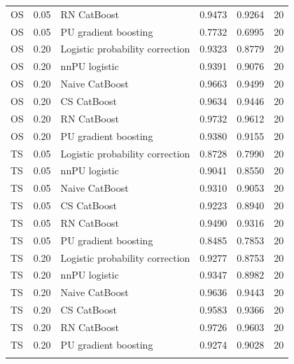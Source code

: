 \begin{longtable}{@{}p{0.65in}rp{2.85in}rrr@{}}
OS & 0.05 & RN CatBoost & 0.9473 & 0.9264 & 20 \\
OS & 0.05 & PU gradient boosting & 0.7732 & 0.6995 & 20 \\
\addlinespace[2pt]
OS & 0.20 & Logistic probability correction & 0.9323 & 0.8779 & 20 \\
OS & 0.20 & nnPU logistic & 0.9391 & 0.9076 & 20 \\
OS & 0.20 & Naive CatBoost & 0.9663 & 0.9499 & 20 \\
OS & 0.20 & CS CatBoost & 0.9634 & 0.9446 & 20 \\
OS & 0.20 & RN CatBoost & 0.9732 & 0.9612 & 20 \\
OS & 0.20 & PU gradient boosting & 0.9380 & 0.9155 & 20 \\
\addlinespace[2pt]
TS & 0.05 & Logistic probability correction & 0.8728 & 0.7990 & 20 \\
TS & 0.05 & nnPU logistic & 0.9041 & 0.8550 & 20 \\
TS & 0.05 & Naive CatBoost & 0.9310 & 0.9053 & 20 \\
TS & 0.05 & CS CatBoost & 0.9223 & 0.8940 & 20 \\
TS & 0.05 & RN CatBoost & 0.9490 & 0.9316 & 20 \\
TS & 0.05 & PU gradient boosting & 0.8485 & 0.7853 & 20 \\
\addlinespace[2pt]
TS & 0.20 & Logistic probability correction & 0.9277 & 0.8753 & 20 \\
TS & 0.20 & nnPU logistic & 0.9347 & 0.8982 & 20 \\
TS & 0.20 & Naive CatBoost & 0.9636 & 0.9443 & 20 \\
TS & 0.20 & CS CatBoost & 0.9583 & 0.9366 & 20 \\
TS & 0.20 & RN CatBoost & 0.9726 & 0.9603 & 20 \\
TS & 0.20 & PU gradient boosting & 0.9274 & 0.9028 & 20 \\
\addlinespace[2pt]
\end{longtable}
\endgroup
